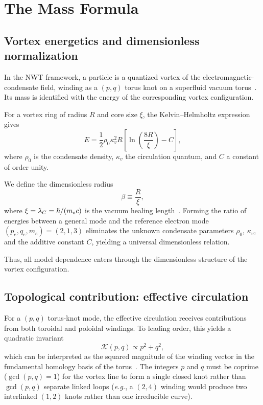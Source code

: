 \documentclass[11pt,a4paper]{article}
\newcommand{\lambdabar}{\mkern0.75mu\mathchar'26\mkern-9.75mu\lambda}
\begin{document}
\section{The Mass Formula}
\label{sec:formula}

\subsection{Vortex energetics and dimensionless normalization}

In the NWT framework, a particle is a quantized vortex of the
electromagnetic-condensate field, winding as a $(p,q)$ torus knot
on a superfluid vacuum torus~\cite{paper2,paper5}.  Its mass is
identified with the energy of the corresponding vortex
configuration.

For a vortex ring of radius $R$ and core size $\xi$, the
Kelvin--Helmholtz expression gives~\cite{Donnelly}
\begin{equation}
  E = \frac{1}{2}\rho_0 \kappa_v^2 R
  \left[\ln\!\left(\frac{8R}{\xi}\right) - C\right],
  \label{eq:kelvin}
\end{equation}
where $\rho_0$ is the condensate density, $\kappa_v$ the circulation
quantum, and $C$ a constant of order unity.

We define the dimensionless radius
\begin{equation}
  \beta \equiv \frac{R}{\xi},
\end{equation}
where $\xi = \lambdabar_C = \hbar/(m_e c)$ is the vacuum healing
length~\cite{paper5}.
Forming the ratio of energies between a general mode and the
reference electron mode $(p_e,q_e,m_e) = (2,1,3)$ eliminates the
unknown condensate parameters $\rho_0$, $\kappa_v$, and the additive
constant $C$, yielding a universal dimensionless relation.

Thus, all model dependence enters through the dimensionless
structure of the vortex configuration.

\subsection{Topological contribution: effective circulation}

For a $(p,q)$ torus-knot mode, the effective circulation receives
contributions from both toroidal and poloidal windings.  To leading
order, this yields a quadratic invariant
\begin{equation}
  \mathcal{K}(p,q) \propto p^2 + q^2,
\end{equation}
which can be interpreted as the squared magnitude of the winding
vector in the fundamental homology basis of the
torus~\cite{paper4}.  The integers $p$ and $q$ must be coprime
($\gcd(p,q) = 1$) for the vortex line to form a single closed knot
rather than $\gcd(p,q)$ separate linked loops (\textit{e.g.}, a $(2,4)$
winding would produce two interlinked $(1,2)$ knots rather than one
irreducible curve).
\end{document}

